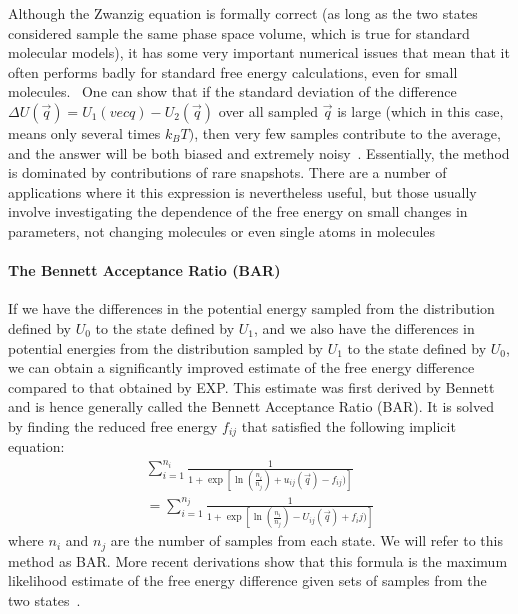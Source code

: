 \documentclass[9pt,bestpractices]{livecoms}
\begin{document}
Although the Zwanzig equation is formally correct (as long as the two states considered sample the same phase space volume, which is true for standard molecular models), it has some very important numerical issues that mean that it often performs badly for standard free energy calculations, even for small molecules.~\cite{shirts2005comparison,lu2003appropriate}  One can show that if the standard deviation of the difference $\Delta U(\vec{q}) = U_1(vec{q})-U_2(\vec{q})$ over all sampled $\vec{q}$ is large (which in this case, means only several times $k_BT)$, then very few samples contribute to the average, and the answer will be both biased and extremely noisy~\cite{xx}. Essentially, the method is dominated by contributions of rare snapshots\cite{jarzynski2006rare, wu2005phasespaceb, wu2005phasespacec}. There are a number of applications where it this expression is nevertheless useful, but those usually involve investigating the dependence of the free energy on small changes in parameters, not changing molecules or even single atoms in molecules~\cite{xx}

\paragraph{The Bennett Acceptance Ratio (BAR)}

If we have the differences in the potential energy sampled from the distribution defined by $U_0$ to the state defined by $U_1$, and we also have the differences in potential energies from the distribution sampled by $U_1$ to the state defined by $U_0$, we can obtain a significantly improved estimate of the
free energy difference compared to that obtained by EXP.  
This estimate was first derived by Bennett and is hence generally called the Bennett Acceptance Ratio (BAR).  It is solved by finding the reduced free energy $f_{ij}$ that satisfied the following implicit equation:
\begin{eqnarray}
 \sum_{i=1}^{n_i} \frac{1}{1 + \exp[\ln(\frac{n_i}{n_j}) + u_{ij}(\vec{q}) - f_{ij})
 ]} \nonumber \\
 =\sum_{i=1}^{n_j} \frac{1}{1 + \exp[\ln(\frac{n_i}{n_j}) - U_{ij}(\vec{q}) + f_ij)]}
\end{eqnarray}
where $n_i$ and $n_j$ are the number of samples from each state. We
will refer to this method as BAR. More recent derivations show that this formula is the maximum likelihood estimate of the free energy difference
given sets of samples from the two states~\cite{shirts.bennett}. 
\end{document}

